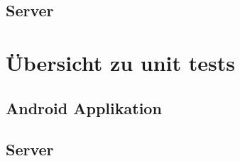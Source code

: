 \documentclass[a4paper]{scrreprt}
\begin{document}
\begin{itemize}
        \end{itemize}


        \section{Server}

       \newpage

    \chapter{Übersicht zu unit tests}

        \section{Android Applikation}

        \section{Server}

    \newpage
\end{document}
